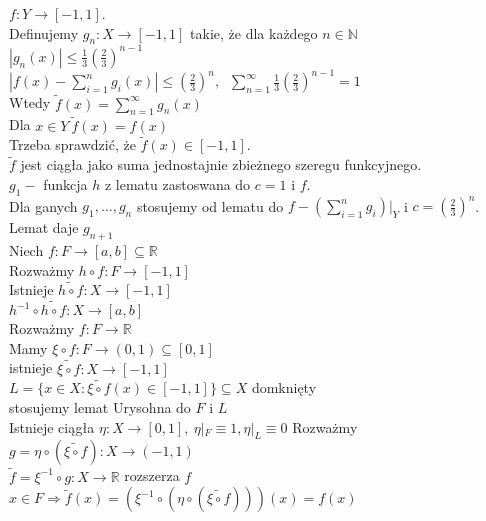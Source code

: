 \begin{dd}
    $f : Y \to [-1,1]$.\\ 
    Definujemy $g_n: X \to [-1,1]$ takie, że dla każdego $n \in \mathbb N$ \\
    $|g_n (x) | \le \frac{1}{3} (\frac{2}{3})^{n-1}$ \\ 
    $|f(x) - \sum\limits_{i = 1}^n g_i (x)| \le (\frac{2}{3})^n, \ $
    $\sum\limits_{n=1}^\infty \frac{1}{3} (\frac{2}{3})^{n-1} = 1$ \\ 
    Wtedy $\widetilde f(x) = \sum\limits_{n=1}^\infty g_n(x)$ \\ 
    Dla $x \in Y \ \widetilde f(x) = f(x)$ \\ 
    Trzeba sprawdzić, że $\widetilde f(x) \in [-1,1]$. \\ 
    $\widetilde f$ jest ciągła jako suma jednostajnie zbieżnego szeregu funkcyjnego. \\ 
    $g_1 - $ funkcja $h$ z lematu zastoswana do $c = 1$ i $f$. \\ 
    Dla ganych $g_1,\ldots,g_n$ stosujemy od lematu do $f-(\sum\limits_{i=1}^n g_i)|_Y$ i $c = (\frac{2}{3})^n$.
    Lemat daje $g_{n+1}$ \\ 
    Niech $ f: F \to [a,b] \subseteq \mathbb R $ \\
    Rozważmy $h \circ f: F \to [-1,1]$ \\ 
    Istnieje $\widetilde{h \circ f}: X \to [-1,1]$ \\ 
    $h^{-1} \circ \widetilde{h \circ f}: X \to [a,b]$ \\ 
    Rozważmy $f: F \to \mathbb R$ \\ 
    Mamy $\xi \circ f: F \to (0,1) \subseteq [0,1]$ \\ 
    istnieje $\widetilde{\xi \circ f} : X \to [-1,1]$ \\ 
    $L = \{ x \in X: \widetilde{\xi \circ f} (x) \in [-1,1] \} \subseteq X$ domknięty \\ 
    stosujemy lemat Urysohna do $F$ i $L$  \\ 
    Istnieje ciągła $\eta: X \to [0,1],\ \eta |_F \equiv 1, \eta |_L \equiv 0$
    Rozważmy $g = \eta \circ (\widetilde{\xi \circ f}) : X \to (-1,1)$ \\ 
    $\widetilde f = \xi^{-1} \circ g : X \to \mathbb R$ rozszerza $f$ \\ 
    $x \in F \Rightarrow \widetilde f (x) = (\xi ^{-1} \circ (\eta \circ (\widetilde{
    \xi \circ f})))(x) = f(x)$ 
\end{dd} 

